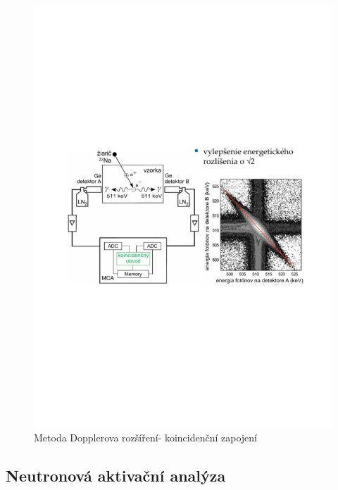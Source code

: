 \begin{figure}[H]
    \centering
    \includegraphics[width=0.8\linewidth, trim={2cm 10cm 2cm 10cm}, clip]{img/dopplerovo_koincidencni_zapojeni.pdf}
    \caption{Metoda Dopplerova rozšíření- koincidenční zapojení}
    \label{fig:6_2_pas_dopplerovo_rozsireni}
\end{figure}

\subsection{Neutronová aktivační analýza}

